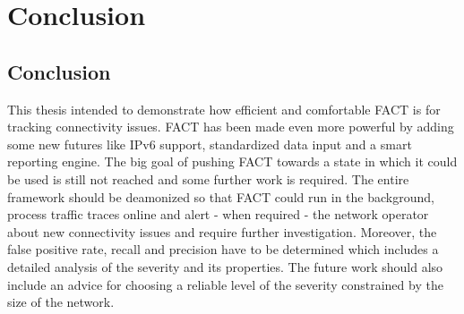 \chapter{Conclusion\label{Conclusion}}

\section{Conclusion}
This thesis intended to demonstrate how efficient and comfortable FACT is for tracking connectivity issues. FACT has been made even more powerful by adding some new futures like IPv6 support, standardized data input and a smart reporting engine. The big goal of pushing FACT towards a state in which it could be used is still not reached and some further work is required. The entire framework should be deamonized so that FACT could run in the background, process traffic traces online and alert - when required  - the network operator about new connectivity issues and require further investigation. Moreover, the false positive rate, recall and precision have to be determined which includes a detailed analysis of the severity and its properties. The future work should also include an advice for choosing a reliable level of the severity constrained by the size of the network.
